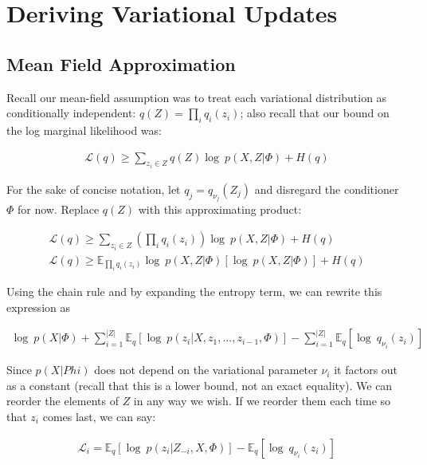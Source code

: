 

\section{Deriving Variational Updates}
\label{append_b}

\subsection{Mean Field Approximation }

Recall our mean-field assumption was to treat each variational distribution as conditionally independent: $q(Z) = \prod\limits_{i} q_i(z_i)$; also recall that our bound on the log marginal likelihood was:


\begin{align} 
\nonumber \mathcal{L}(q) \geq \sum\limits_{z_i \in Z} q(Z) \log\ p(X,Z|\Phi) + H(q) \end{align}


For the sake of concise notation, let $q_j = q_{\nu_j}(Z_j)$ and disregard the conditioner $\Phi$ for now. Replace $q(Z)$ with this approximating product:

\begin{align} 
\nonumber \mathcal{L}(q) \geq \sum\limits_{z_i \in Z} \left( \prod\limits_{i} q_i(z_i) \right) \log\ p(X,Z|\Phi) + H(q) \\
\mathcal{L}(q) \geq \mathbb{E}_{ \prod\limits_{i} q_i(z_i) } \log\ p(X,Z|\Phi) [\log\ p(X,Z|\Phi)] + H(q)
\end{align}

Using the chain rule and by expanding the entropy term, we can rewrite this expression as

\begin{align} \log\ p(X|\Phi) + \sum\limits_{i=1}^{| Z|} \mathbb{E}_q [\log\ p(z_i | X, z_1,..., z_{i-1}, \Phi)] - \sum\limits_{i=1}^{| Z|} \mathbb{E}_q[\log\ q_{\nu_i}(z_i)] \end{align}

Since $p(X \vert Phi)$ does not depend on the variational parameter $\nu_i$ it factors out as a constant (recall that this is a lower bound, not an exact equality). We can reorder the elements of $Z$ in any way we wish. If we reorder them each time so that $z_i$ comes last, we can say:

\begin{align} \mathcal{L}_i = \mathbb{E}_q[\log\ p(z_i| Z_{-i}, X, \Phi)] - \mathbb{E}_q[\log\ q_{\nu_i}(z_i)]
\end{align} \citep{blei:2006}

